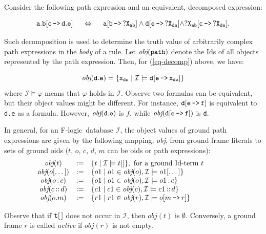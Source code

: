 \documentclass[11pt]{article}
\newcommand{\obj}{\textit{obj}\xspace}
\newcommand{\db}[1]{\ensuremath{\mathcal{#1}}}
\newcommand{\isa}{\,{\bf{:}}\,}
\newcommand{\subcl}{\,{\bf{::}}\,}
\newcommand{\mvd}{{\mbox{\tt \,->\,}}}  %
\newcommand{\fl}{\mbox{F-logic}\xspace}
\begin{document}
Consider the following path expression and an equivalent, decomposed
expression:

\begin{equation}\label{eq-decomp}
\tt
a.b[c\mvd d.e] \quad\ \Leftrightarrow \quad\  a[b\mvd ?X_{ab}]
\land d[e\mvd ?X_{de}] \land ?X_{ab}[c\mvd ?X_{de}]. 
\end{equation}

\noindent
Such decomposition is used to determine the truth value of arbitrarily complex
path expressions in the \emph{body} of a rule.  Let $\tt \obj(path)$ denote
the Ids of all objects represented by the path expression. Then, for
(\ref{eq-decomp}) above, we have:

\begin{displaymath} \tt
\obj(d.e) = \{x_{de} \mid \db I \models d[e\mvd 
x_{de}]\} 
\end{displaymath}
%
where $\db I \models \varphi$ means that $\varphi$ holds in \db I.  Observe
two formulas can be equivalent, but their object values might be different.
For instance, $\tt d[e\mvd f]$ is equivalent to {\tt d.e} as a formula.
However, $\tt \obj(d.e)$ is $f$, while $\tt \obj(d[e\mvd f])$ is {\tt d}.

In general, for an \fl\ database \db I, the object values of ground path
expressions are given by the following mapping, \obj, from ground frame
literals
to sets of ground oids ($t$, $o$, $c$, $d$, $m$ can be oids or path
expressions):
%
\begin{displaymath}
  \begin{array}{cll@{\hspace{4em}}c}
    \obj(t) & := & \{t \mid  \db I\models t[] \}, 
     \textrm{ for a ground Id-term $t$}  \\   
    \obj(o[\dots]) & := & \{o1 \mid o1\in\obj(o), \db I \models o1[\dots]
    \} \\  
    \obj(o\isa c) & := & \{o1 \mid o1\in\obj(o), \db I \models o1\isa c\}
     \\ 
    \obj(c\subcl d) & := & \{c1 \mid c1\in\obj(c), \db I \models c1\subcl
    d\} \\ 
    \obj(o.m) & :=  & \{r1 \mid r1\in\obj(r), \db I \models o[m\mvd
    r]\}  
  \end{array}
\end{displaymath}

Observe that if $\tt t[\,]$ does not occur in \db{I}, then $\obj(t)$ is
$\emptyset$.  Conversely, a ground frame $r$ is called \emph{active} if
$\obj(r)$ is not empty.
\end{document}
